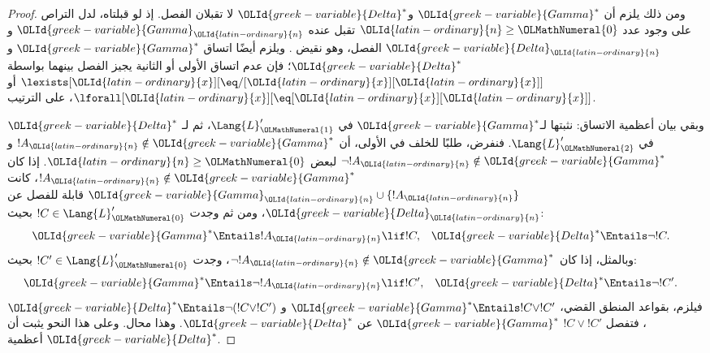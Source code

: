 \documentclass[../../../include/open-logic-section]{subfiles}
\begin{document}
\begin{proof}
ومن ذلك يلزم أن ${\OLId{greek-variable}{Gamma}}^*$ و${\OLId{greek-variable}{Delta}}^*$ لا تقبلان الفصل. إذ لو قبلتاه، لدل التراص
على وجود عدد ${\OLId{latin-ordinary}{n}} \ge {\OLMathNumeral{0}}$ تقبل عنده ${\OLId{greek-variable}{Gamma}}_{\OLId{latin-ordinary}{n}}$ و${\OLId{greek-variable}{Delta}}_{\OLId{latin-ordinary}{n}}$ الفصل، وهو نقيض
. ويلزم أيضًا اتساق ${\OLId{greek-variable}{Gamma}}^*$ و${\OLId{greek-variable}{Delta}}^*$؛ فإن
عدم اتساق الأولى أو الثانية يجيز الفصل بينهما بواسطة
$\lexists[{\OLId{latin-ordinary}{x}}][\eq/[{\OLId{latin-ordinary}{x}}][{\OLId{latin-ordinary}{x}}]]$ أو $\lforall[{\OLId{latin-ordinary}{x}}][\eq[{\OLId{latin-ordinary}{x}}][{\OLId{latin-ordinary}{x}}]]$، على الترتيب.

وبقي بيان أعظمية الاتساق: نثبتها لـ${\OLId{greek-variable}{Gamma}}^*$ في $\Lang{L}'_{\OLMathNumeral{1}}$، ثم لـ
${\OLId{greek-variable}{Delta}}^*$ في $\Lang{L}'_{\OLMathNumeral{2}}$. فنفرض، طلبًا للخلف في الأولى، أن
$!A_{\OLId{latin-ordinary}{n}} \notin {\OLId{greek-variable}{Gamma}}^*$ و$\lnot !A_{\OLId{latin-ordinary}{n}} \notin {\OLId{greek-variable}{Gamma}}^*$ لبعض
${\OLId{latin-ordinary}{n}} \ge {\OLMathNumeral{0}}$. إذا كان $!A_{\OLId{latin-ordinary}{n}} \notin {\OLId{greek-variable}{Gamma}}^*$، كانت
${\OLId{greek-variable}{Gamma}}_{\OLId{latin-ordinary}{n}} \cup \{!A_{\OLId{latin-ordinary}{n}}\}$ قابلة للفصل عن ${\OLId{greek-variable}{Delta}}_{\OLId{latin-ordinary}{n}}$، ومن ثم وجدت
$!C \in \Lang{L}'_{\OLMathNumeral{0}}$ بحيث:
\begin{align*}
  {\OLId{greek-variable}{Gamma}}^* & \Entails !A_{\OLId{latin-ordinary}{n}} \lif !C, &
  {\OLId{greek-variable}{Delta}}^* & \Entails \lnot !C.
\end{align*}
وبالمثل، إذا كان $\lnot !A_{\OLId{latin-ordinary}{n}} \notin {\OLId{greek-variable}{Gamma}}^*$، وجدت
$!C' \in \Lang{L}'_{\OLMathNumeral{0}}$ بحيث:
\begin{align*}
  {\OLId{greek-variable}{Gamma}}^* & \Entails \lnot !A_{\OLId{latin-ordinary}{n}} \lif !C', &
  {\OLId{greek-variable}{Delta}}^* & \Entails \lnot !C'.
\end{align*}
فيلزم، بقواعد المنطق القضي، ${\OLId{greek-variable}{Gamma}}^* \Entails !C \lor !C'$ و
${\OLId{greek-variable}{Delta}}^* \Entails \lnot (!C \lor !C')$، فتفصل $!C \lor !C'$
${\OLId{greek-variable}{Gamma}}^*$ عن ${\OLId{greek-variable}{Delta}}^*$. وهذا محال. وعلى هذا النحو يثبت أن ${\OLId{greek-variable}{Delta}}^*$ أعظمية.


\end{proof}
\end{document}
